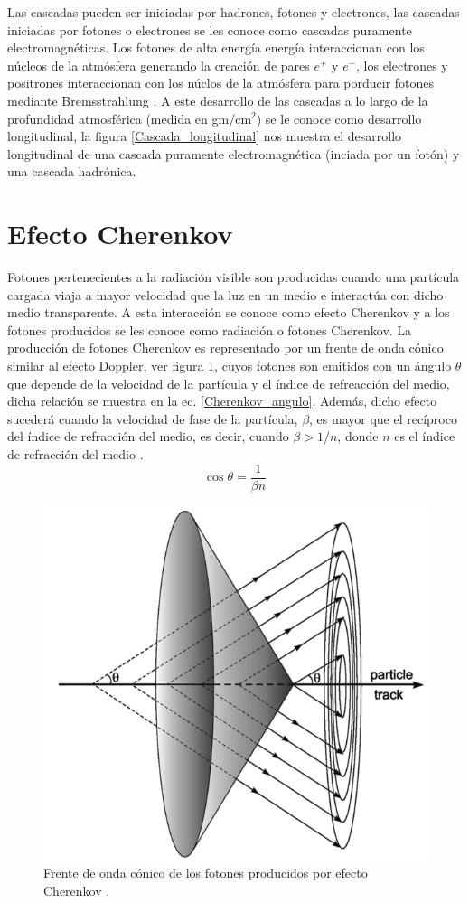 	Las cascadas pueden ser iniciadas por hadrones, fotones y electrones, las cascadas iniciadas por fotones o electrones se les conoce como cascadas puramente electromagnéticas. Los fotones de alta energía energía interaccionan con los núcleos de la atmósfera generando la creación de pares $e^+$ y $e^-$, los electrones y positrones interaccionan con los núclos de la atmósfera para porducir fotones mediante Bremsstrahlung \cite{MOLLERACH201885}. A este desarrollo de las cascadas a lo largo de la profundidad atmosférica (medida en gm/cm$^2$) se le conoce como desarrollo longitudinal, la figura \ref{Cascada_longitudinal} nos muestra el desarrollo longitudinal de una cascada puramente electromagnética (inciada por un fotón) y una cascada hadrónica.

\section{Efecto Cherenkov} \label{EFECTO_CHERENKOV}
	Fotones pertenecientes a la radiación visible son producidas cuando una partícula cargada viaja a mayor velocidad que la luz en un medio e interactúa con dicho medio transparente. A esta interacción se conoce como efecto Cherenkov y a los fotones producidos se les conoce como radiación o fotones Cherenkov. La producción de fotones Cherenkov es representado por un frente de onda cónico similar al efecto Doppler, ver figura \ref{Efecto_Cherenkov}, cuyos fotones son emitidos con un ángulo $\theta$ que depende de la velocidad de la partícula y el índice de refreacción del medio, dicha relación se muestra en la ec. \ref{Cherenkov_angulo}. Además, dicho efecto sucederá cuando la velocidad de fase de la partícula, $\beta$, es mayor que el recíproco del índice de refracción del medio, es decir, cuando $\beta > 1/n$, donde $n$ es el índice de refracción del medio \cite{LANNUNZIATA2016547}.
	\begin{equation} \label{Cherenkov_angulo}
		\cos \theta = \frac{1}{\beta n}
	\end{equation}
	
	\begin{figure}[h]
		\centering
		\includegraphics[scale = 0.45]{FIGURAS/EFECTO_CHERENKOV.png}
		\caption{Frente de onda cónico de los fotones producidos por efecto Cherenkov \cite{LANNUNZIATA2016547}.}
		\label{Efecto_Cherenkov}
	\end{figure}